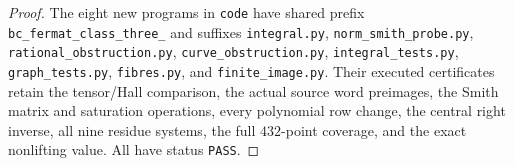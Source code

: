 \begin{proof}
The eight new programs in \texttt{code} have
shared prefix \texttt{bc\_fermat\_class\_three\_}
and suffixes \texttt{integral.py},
\texttt{norm\_smith\_probe.py},
\texttt{rational\_obstruction.py},
\texttt{curve\_obstruction.py},
\texttt{integral\_tests.py},
\texttt{graph\_tests.py}, \texttt{fibres.py}, and
\texttt{finite\_image.py}.  Their executed
certificates retain the tensor/Hall comparison,
the actual source word preimages, the Smith
matrix and saturation operations, every
polynomial row change, the central right
inverse, all nine residue systems, the full
$432$-point coverage, and the exact nonlifting
value.  All have status \texttt{PASS}.
\end{proof}
